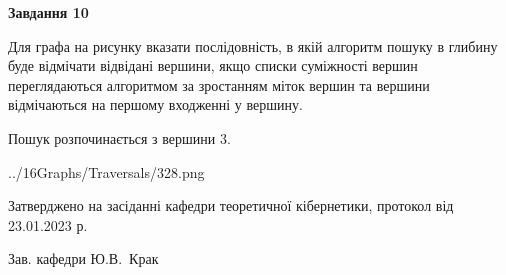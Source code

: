 \documentclass[12pt, ukrainian]{article}
\begin{document}
{\begin {large}
{\begin {center}\textbf{Завдання 10}\end {center}}\par
Для графа на рисунку вказати послідовність, в якій алгоритм пошуку в глибину буде відмічати відвідані вершини, якщо списки суміжності вершин переглядаються алгоритмом за зростанням міток вершин та вершини відмічаються на першому вход\-женні у вершину.\par
Пошук розпочинається з вершини 3.\par

\begin{center}
	{../16Graphs/Traversals/328.png}
\end{center}\par
\newpage


\end {large}
}
{\smallskip \begin {small} Затверджено на засіданні кафедри теоретичної кібернетики, протокол  від   23.01.2023 р.\par\smallskip\smallskip
{\parbox {6.5 cm}{Зав. кафедри \dotfill Ю.В.~Крак}} \end{small}}
\end{document}
